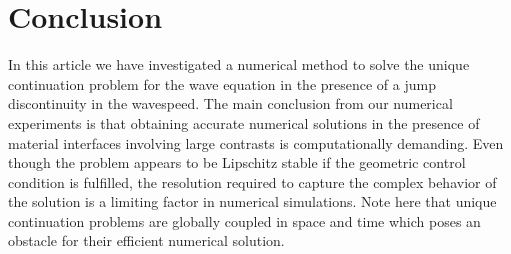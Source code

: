 \documentclass[sn-mathphys-num]{sn-jnl}
\numberwithin{equation}{section}
\begin{document}
\section{Conclusion}
In this article we have investigated a numerical method to solve the unique continuation problem 
for the wave equation in the presence of a jump discontinuity in the wavespeed. The main conclusion from our numerical experiments is that obtaining accurate numerical solutions in the presence of material interfaces involving large contrasts is computationally demanding. Even though the problem appears to be Lipschitz stable if the geometric control condition is fulfilled, the resolution required to capture the complex behavior of the solution is a limiting factor in numerical simulations. Note here that unique continuation problems are globally coupled in space and time which poses an obstacle for their efficient numerical solution. 



\end{document}
